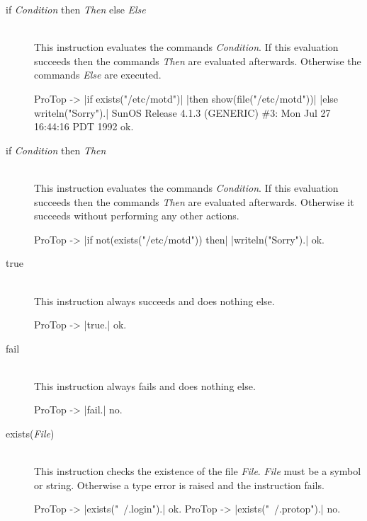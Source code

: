 \begin{description}
\begin{description}
  \end{description}

  \item [if {\em Condition}\/ then {\em Then}\/ else {\em
      Else}]\ 
    \\
    This instruction evaluates the commands {\em Condition}. If this
    evaluation succeeds then the commands {\em Then}\/ are evaluated
    afterwards. Otherwise the commands {\em Else}\/ are executed.
\begin{BoxedSample}
  ProTop -> |if exists("/etc/motd")|
            |then show(file("/etc/motd"))|
            |else writeln("Sorry").|
  SunOS Release 4.1.3 (GENERIC) \#3: Mon Jul 27 16:44:16 PDT 1992
  ok. 
\end{BoxedSample}

  \item [if {\em Condition}\/ then {\em Then}]\ 
    \\
    This instruction evaluates the commands {\em Condition}. If this
    evaluation succeeds then the commands {\em Then}\/ are evaluated
    afterwards. Otherwise it succeeds without performing any other actions.
\begin{BoxedSample}
  ProTop -> |if not(exists("/etc/motd")) then|
              |writeln("Sorry").|
  ok.
\end{BoxedSample}

  \item [true]\ \\
  This instruction always succeeds and does nothing else.
\begin{BoxedSample}
  ProTop -> |true.|
  ok.
\end{BoxedSample}

  \item [fail]\ \\
  This instruction always fails and does nothing else.
\begin{BoxedSample}
  ProTop -> |fail.|
  no.
\end{BoxedSample}

  \item [exists({\em File})]\ \\
  This instruction checks the existence of the file {\em File}. {\em File}
  must be a symbol or string. Otherwise a type error is raised and the
  instruction fails.
\begin{BoxedSample}
  ProTop -> |exists("~/.login").|
  ok.
  ProTop -> |exists("~/.protop").|
  no.
\end{BoxedSample}


\end{description}
